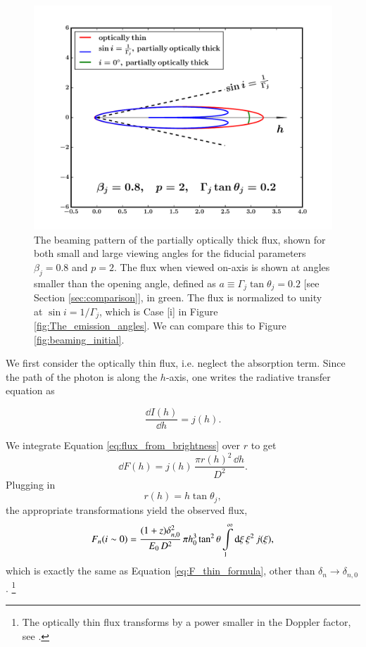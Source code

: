 \begin{figure}
\begin{center}
\includegraphics[scale=0.5]{beaming_final.pdf}
\caption[The beaming pattern of the partially optically thick flux: side-view and on-axis view]{The beaming pattern of the partially optically thick flux, shown for both small and large viewing angles for the fiducial parameters $\beta_j = 0.8$ and $p = 2$. The flux when viewed on-axis is shown at angles smaller than the opening angle, defined as $a \equiv \Gamma_j \tan \theta_j = 0.2$ [see Section \ref{sec:comparison}], in green. The flux is normalized to unity at $\sin i = 1 / \Gamma_j$, which is Case [i] in Figure \ref{fig:The_emission_angles}. We can compare this to Figure \ref{fig:beaming_initial}.}
\label{fig:beaming_final}
\end{center}
\end{figure}

We first consider the optically thin flux, i.e. neglect the absorption term. Since the path of the photon is along the $h$-axis, one writes the radiative transfer equation as

\begin{equation}
\dfrac{\dd I(h)}{\dd h} = j(h).
\label{eq:optically_thin_radiative_transfer_equation}
\end{equation}

We integrate Equation \ref{eq:flux_from_brightness} over $r$ to get 
\begin{equation}
\dd F(h) = j(h) \, \dfrac{\pi r(h)^{2}\, \dd h}{D^2}.
\end{equation}
Plugging in
\begin{equation}
r(h) = h \tan \theta_j,
\label{eq:r_of_h}
\end{equation}
the appropriate transformations yield the observed flux,
\begin{equation}
F_{n}  (i \sim 0) = \frac{ (1+z) \delta_{n,0}^2 }{ \ee\, D^2 } \, \pi h_0^{3} \tan^2 \theta \intop_{1}^{\infty} \dd \xi \, \xi^2 \, j(\xi) ,
\end{equation}
which is exactly the same as Equation \ref{eq:F_thin_formula}, other than $\delta_n \to \delta_{n,0}$. \footnote{The optically thin flux transforms by a power smaller in the Doppler factor, see .}


